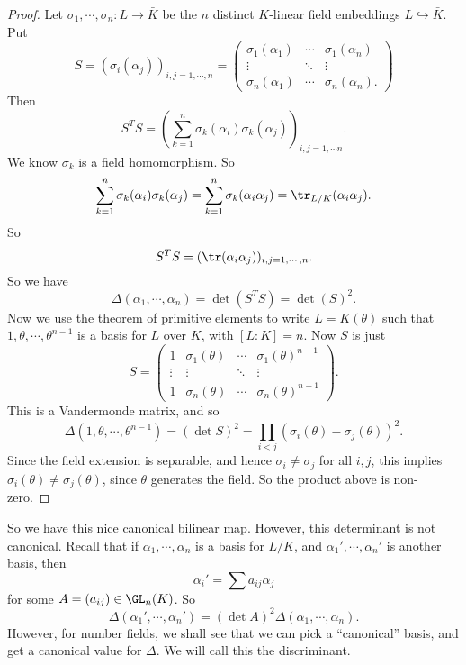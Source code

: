 \documentclass[a4paper]{article}
\begin{document}
\begin{proof}
  Let $\sigma_1, \cdots, \sigma_n: L \to \bar{K}$ be the $n$ distinct $K$-linear field embeddings $L \hookrightarrow \bar{K}$. Put
  \[
    S = (\sigma_i(\alpha_j))_{i, j = 1, \cdots, n} =
    \begin{pmatrix}
      \sigma_1(\alpha_1) & \cdots & \sigma_1(\alpha_n)\\
      \vdots & \ddots & \vdots\\
      \sigma_n(\alpha_1) & \cdots & \sigma_n(\alpha_n).
    \end{pmatrix}
  \]
  Then
  \[
    S^T S = \left(\sum_{k = 1}^n \sigma_k(\alpha_i)\sigma_k(\alpha_j)\right)_{i,j = 1, \cdots n}.
  \]
  We know $\sigma_k$ is a field homomorphism. So
  \[
    \sum_{k = 1}^n \sigma_k (\alpha_i)\sigma_k(\alpha_j) = \sum_{k = 1}^n \sigma_k(\alpha_i \alpha_j) = \tr_{L/K}(\alpha_i \alpha_j).
  \]
  So
  \[
    S^T S = (\tr(\alpha_i\alpha_j))_{i, j = 1, \cdots, n}.
  \]
  So we have
  \[
    \Delta(\alpha_1, \cdots, \alpha_n) = \det(S^T S) = \det(S)^2.
  \]
  Now we use the theorem of primitive elements to write $L = K(\theta)$ such that $1, \theta, \cdots, \theta^{n - 1}$ is a basis for $L$ over $K$, with $[L:K] = n$. Now $S$ is just
  \[
    S =
    \begin{pmatrix}
      1 & \sigma_1(\theta) & \cdots & \sigma_1(\theta)^{n - 1}\\
      \vdots & \vdots & \ddots & \vdots\\
      1 & \sigma_n(\theta) & \cdots & \sigma_n(\theta)^{n - 1}
    \end{pmatrix}.
  \]
  This is a Vandermonde matrix, and so
  \[
    \Delta(1, \theta, \cdots, \theta^{n - 1}) = (\det S)^2 = \prod_{i < j} (\sigma_i(\theta) - \sigma_j(\theta))^2.
  \]
  Since the field extension is separable, and hence $\sigma_i \not= \sigma_j$ for all $i, j$, this implies $\sigma_i (\theta) \not= \sigma_j(\theta)$, since $\theta$ generates the field. So the product above is non-zero.
\end{proof}
So we have this nice canonical bilinear map. However, this determinant is not canonical. Recall that if $\alpha_1, \cdots, \alpha_n$ is a basis for $L/K$, and $\alpha_1', \cdots, \alpha_n'$ is another basis, then
\[
  \alpha_i' = \sum a_{ij}\alpha_j
\]
for some $A = (a_{ij}) \in \GL_n(K)$. So
\[
  \Delta(\alpha_1', \cdots, \alpha_n') = (\det A)^2 \Delta(\alpha_1, \cdots, \alpha_n).
\]
However, for number fields, we shall see that we can pick a ``canonical'' basis, and get a canonical value for $\Delta$. We will call this the discriminant.
\end{document}
